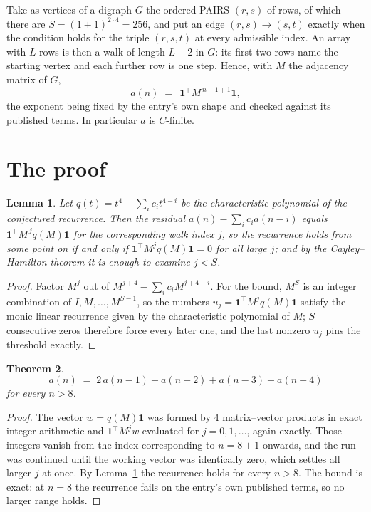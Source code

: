\documentclass[11pt,a4paper]{article}
\theoremstyle{plain}
\newtheorem{theorem}{Theorem}
\newtheorem{lemma}[theorem]{Lemma}
\theoremstyle{definition}
\begin{document}
Take as vertices of a digraph $G$ the ordered PAIRS $(r,s)$ of rows, of which there are
$S=(1+1)^{2\cdot4}=256$, and put an edge $(r,s)\to(s,t)$ exactly when the condition
holds for the triple $(r,s,t)$ at every admissible index. An array with $L$ rows is then a
walk of length $L-2$ in $G$: its first two rows name the starting vertex and each further
row is one step. Hence, with $M$ the adjacency matrix of $G$,
\[
a(n)\;=\;\,\mathbf{1}^{\!\top}M^{\,n-1+1}\mathbf{1},
\]
the exponent being fixed by the entry's own shape and checked against its published terms.
In particular $a$ is $C$-finite.

\section{The proof}

\begin{lemma}\label{lem:crit}
Let $q(t)=t^{4}-\sum_i c_it^{4-i}$ be the characteristic polynomial of the
conjectured recurrence. Then the residual $a(n)-\sum_ic_ia(n-i)$ equals
$\mathbf{1}^{\!\top}M^{\,j}q(M)\mathbf{1}$ for the corresponding walk index
$j$, so the recurrence holds from some point on if and only if
$\mathbf{1}^{\!\top}M^{j}q(M)\mathbf{1}=0$ for all large $j$; and by the
Cayley--Hamilton theorem it is enough to examine $j<S$.
\end{lemma}

\begin{proof}
Factor $M^{j}$ out of $M^{j+4}-\sum_ic_iM^{j+4-i}$. For the bound, $M^{S}$
is an integer combination of $I,M,\dots,M^{S-1}$, so the numbers
$u_j=\mathbf{1}^{\!\top}M^{j}q(M)\mathbf{1}$ satisfy the monic linear recurrence given by
the characteristic polynomial of $M$; $S$ consecutive zeros therefore force every later one,
and the last nonzero $u_j$ pins the threshold exactly.
\end{proof}

\begin{theorem}
\[
a(n)\;=\;2\,a(n-1) - a(n-2) + a(n-3) - a(n-4)
\]
for every $n>8$.
\end{theorem}

\begin{proof}
The vector $w=q(M)\mathbf{1}$ was formed by $4$ matrix--vector products in exact
integer arithmetic and $\mathbf{1}^{\!\top}M^{j}w$ evaluated for $j=0,1,\dots$, again
exactly. Those integers vanish from the index corresponding to $n=8+1$ onwards, and the
run was continued until the working vector was identically zero, which settles all larger $j$
at once. By Lemma~\ref{lem:crit} the recurrence holds for every $n>8$. The bound is exact: at $n=8$ the recurrence fails on the entry's own published terms, so no larger range holds.
\end{proof}
\end{document}
